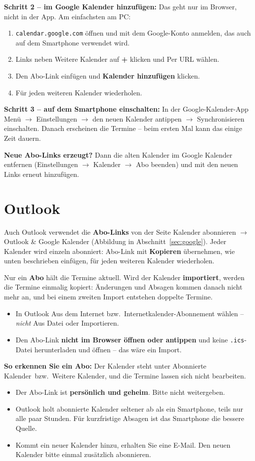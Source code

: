 \documentclass[a4paper,fontsize=10pt]{scrartcl}
\newcommand{\knopf}[1]{\textsf{\textbf{#1}}}
\newcommand{\nichtimportieren}[1]{%
  \begin{dshinweis}[title={Wichtig: abonnieren -- nicht importieren}]
  Nur ein \textbf{Abo} hält die Termine aktuell. Wird der Kalender
  \textbf{importiert}, werden die Termine einmalig kopiert: Änderungen und
  Absagen kommen danach nicht mehr an, und bei einem zweiten Import entstehen
  doppelte Termine.
  \begin{itemize}[leftmargin=1.2em]
    #1
    \item Den Abo-Link \textbf{nicht im Browser öffnen oder antippen} und
          keine \texttt{.ics}-Datei herunterladen und öffnen -- das wäre ein
          Import.
  \end{itemize}
  \textbf{So erkennen Sie ein Abo:} Der Kalender steht unter
  \glqq Abonnierte Kalender\grqq\ bzw.\ \glqq Weitere Kalender\grqq, und die
  Termine lassen sich nicht bearbeiten.
  \end{dshinweis}}
\newcommand{\menue}[1]{\textsf{#1}}
\begin{document}
\textbf{Schritt 2 -- im Google Kalender hinzufügen:} Das geht nur im
Browser, nicht in der App. Am einfachsten am PC:

\begin{enumerate}
  \item \texttt{calendar.google.com} öffnen und mit dem Google-Konto anmelden,
        das auch auf dem Smartphone verwendet wird.
  \item Links neben \menue{Weitere Kalender} auf \knopf{+} klicken und
        \menue{Per URL} wählen.
  \item Den Abo-Link einfügen und \knopf{Kalender hinzufügen} klicken.
  \item Für jeden weiteren Kalender wiederholen.
\end{enumerate}

\textbf{Schritt 3 -- auf dem Smartphone einschalten:} In der
Google-Kalender-App Menü $\rightarrow$ \menue{Einstellungen} $\rightarrow$
den neuen Kalender antippen $\rightarrow$ \menue{Synchronisieren}
einschalten. Danach erscheinen die Termine -- beim ersten Mal kann das
einige Zeit dauern.

\textbf{Neue Abo-Links erzeugt?} Dann die alten Kalender im Google Kalender
entfernen (\menue{Einstellungen} $\rightarrow$ Kalender $\rightarrow$
\menue{Abo beenden}) und mit den neuen Links erneut hinzufügen.

\section{Outlook}\label{sec:outlook}

Auch Outlook verwendet die \textbf{Abo-Links} von der Seite
\menue{Kalender abonnieren} $\rightarrow$ \menue{Outlook \& Google
Kalender} (Abbildung in Abschnitt~\ref{sec:google}). Jeder Kalender wird einzeln
abonniert: Abo-Link mit \knopf{Kopieren} übernehmen, wie unten beschrieben
einfügen, für jeden weiteren Kalender wiederholen.

\nichtimportieren{\item In Outlook \menue{Aus dem Internet} bzw.\
  \menue{Internetkalender-Abonnement} wählen -- \emph{nicht}
  \menue{Aus Datei} oder \menue{Importieren}.}

\begin{dshinweis}[title={Bitte beachten}]
\begin{itemize}[leftmargin=1.2em]
  \item Der Abo-Link ist \textbf{persönlich und geheim}. Bitte nicht
        weitergeben.
  \item Outlook holt abonnierte Kalender seltener ab als ein Smartphone,
        teils nur alle paar Stunden. Für kurzfristige Absagen ist das
        Smartphone die bessere Quelle.
  \item Kommt ein neuer Kalender hinzu, erhalten Sie eine E-Mail. Den neuen
        Kalender bitte einmal zusätzlich abonnieren.
\end{itemize}
\end{dshinweis}
\end{document}
